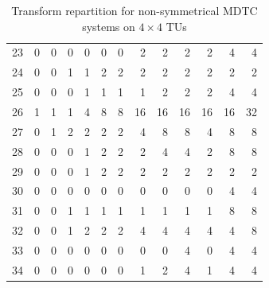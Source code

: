 \documentclass[11pt,a4paper,openright,twoside]{book}
\numberwithin{equation}{section} %
\numberwithin{figure}{section} %
\numberwithin{table}{section} %
\begin{document}
\begin{table}[ht]
\begin{tabular}{c|rrrrrrrrrrrr}
		23 & 0 & 0 & 0 & 0  & 0  & 0  & 2  & 2  & 2  & 2  & 4  & 4 \\
		24 & 0 & 0 & 1 & 1  & 2  & 2  & 2  & 2  & 2  & 2  & 2  & 2 \\
		25 & 0 & 0 & 0 & 1  & 1  & 1  & 1  & 2  & 2  & 2  & 4  & 4 \\
		26 & 1 & 1 & 1 & 4  & 8  & 8  & 16 & 16 & 16 & 16 & 16 & 32 \\
		27 & 0 & 1 & 2 & 2  & 2  & 2  & 4  & 8  & 8  & 4  & 8  & 8 \\
		28 & 0 & 0 & 0 & 1  & 2  & 2  & 2  & 4  & 4  & 2  & 8  & 8 \\
		29 & 0 & 0 & 0 & 1  & 2  & 2  & 2  & 2  & 2  & 2  & 2  & 2 \\
		30 & 0 & 0 & 0 & 0  & 0  & 0  & 0  & 0  & 0  & 0  & 4  & 4 \\
		31 & 0 & 0 & 1 & 1  & 1  & 1  & 1  & 1  & 1  & 1  & 8  & 8 \\
		32 & 0 & 0 & 1 & 2  & 2  & 2  & 4  & 4  & 4  & 4  & 4  & 8 \\
		33 & 0 & 0 & 0 & 0  & 0  & 0  & 0  & 0  & 4  & 0  & 4  & 4 \\
		34 & 0 & 0 & 0 & 0  & 0  & 0  & 1  & 2  & 4  & 1  & 4  & 4 \\
	\end{tabular}
	\caption{Transform repartition for non-symmetrical \acs{MDTC} systems on
	$4\times4$ \acsp{TU}}
	\label{tab:config_nonsym_mdtc_4}
\end{table}
\end{document}
